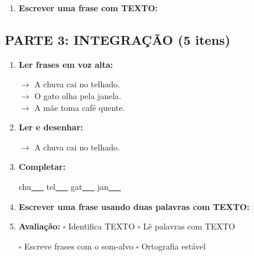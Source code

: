 \begin{exercicio}
\begin{enumerate}[resume]
  \item \textbf{Escrever uma frase com TEXTO:}
  \begin{center}
  \underline{\hspace{12cm}}
  \end{center}

\end{enumerate}

\subsection*{PARTE 3: INTEGRAÇÃO (5 itens)}

\begin{enumerate}[resume]

  \item \textbf{Ler frases em voz alta:}
  \begin{center}
  $\rightarrow$ A chuva cai no telhado.\\
  $\rightarrow$ O gato olha pela janela.\\
  $\rightarrow$ A mãe toma café quente.\\
  \end{center}

  \item \textbf{Ler e desenhar:}
  \begin{center}
  $\rightarrow$ A chuva cai no telhado.
  \end{center}
  \begin{center}
  \end{center}

  \item \textbf{Completar:}
  \begin{center}
  chu\underline{~~~} \quad tel\underline{~~~} \quad gat\underline{~~~} \quad jan\underline{~~~}
  \end{center}

  \item \textbf{Escrever uma frase usando duas palavras com TEXTO:}
  \begin{center}
  \underline{\hspace{12cm}}
  \end{center}

  \item \textbf{Avaliação:} $\square$ Identifica TEXTO \quad $\square$ Lê palavras com TEXTO
  \begin{center}
  $\square$ Escreve frases com o som-alvo \quad $\square$ Ortografia estável
  \end{center}


\end{enumerate}
\end{exercicio}
